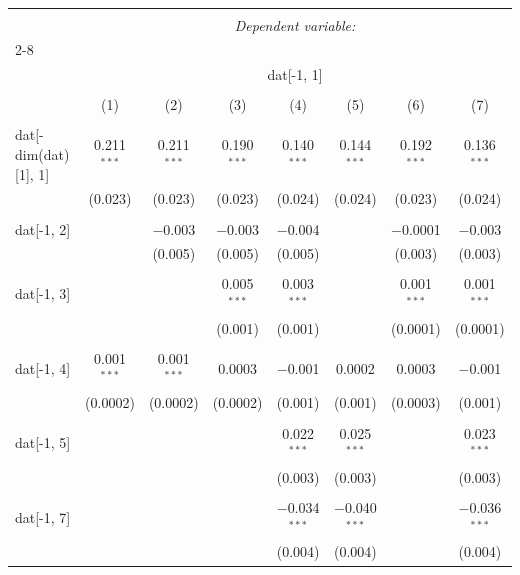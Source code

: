 
\begin{table}[!htbp] \centering 
  \caption{} 
  \label{} 
\begin{tabular}{@{\extracolsep{5pt}}lccccccc} 
\\[-1.8ex]\hline 
\hline \\[-1.8ex] 
 & \multicolumn{7}{c}{\textit{Dependent variable:}} \\ 
\cline{2-8} 
\\[-1.8ex] & \multicolumn{7}{c}{dat[-1, 1]} \\ 
\\[-1.8ex] & (1) & (2) & (3) & (4) & (5) & (6) & (7)\\ 
\hline \\[-1.8ex] 
 dat[-dim(dat)[1], 1] & 0.211$^{***}$ & 0.211$^{***}$ & 0.190$^{***}$ & 0.140$^{***}$ & 0.144$^{***}$ & 0.192$^{***}$ & 0.136$^{***}$ \\ 
  & (0.023) & (0.023) & (0.023) & (0.024) & (0.024) & (0.023) & (0.024) \\ 
  & & & & & & & \\ 
 dat[-1, 2] &  & $-$0.003 & $-$0.003 & $-$0.004 &  & $-$0.0001 & $-$0.003 \\ 
  &  & (0.005) & (0.005) & (0.005) &  & (0.003) & (0.003) \\ 
  & & & & & & & \\ 
 dat[-1, 3] &  &  & 0.005$^{***}$ & 0.003$^{***}$ &  & 0.001$^{***}$ & 0.001$^{***}$ \\ 
  &  &  & (0.001) & (0.001) &  & (0.0001) & (0.0001) \\ 
  & & & & & & & \\ 
 dat[-1, 4] & 0.001$^{***}$ & 0.001$^{***}$ & 0.0003 & $-$0.001 & 0.0002 & 0.0003 & $-$0.001 \\ 
  & (0.0002) & (0.0002) & (0.0002) & (0.001) & (0.001) & (0.0003) & (0.001) \\ 
  & & & & & & & \\ 
 dat[-1, 5] &  &  &  & 0.022$^{***}$ & 0.025$^{***}$ &  & 0.023$^{***}$ \\ 
  &  &  &  & (0.003) & (0.003) &  & (0.003) \\ 
  & & & & & & & \\ 
 dat[-1, 7] &  &  &  & $-$0.034$^{***}$ & $-$0.040$^{***}$ &  & $-$0.036$^{***}$ \\ 
  &  &  &  & (0.004) & (0.004) &  & (0.004) \\ 

\end{tabular}
\end{table}
